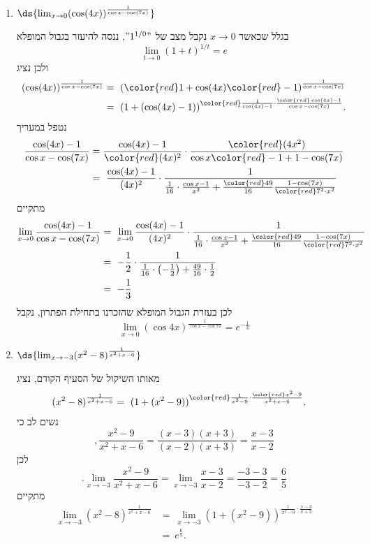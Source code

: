\begin{enumerate}
\item $\ds{ \lim_{x \to 0} (\cos(4x))^{\frac{1}{\cos x - \cos(7x)}}}$

\ifsol
{}
\begin{solbox}
בגלל שכאשר
$x\to0$
נקבל מצב של
$"1^{1/0}"$,
ננסה להיעזר בגבול המופלא
$$\lim_{t\to0}(1+t)^{1/t}=e$$
ולכן
נציג
\begin{align*}
    (\cos(4x))^{\frac{1}{\cos x - \cos(7x)}}&=\ ({\color{red}1}+\cos(4x){\color{red}-1})^{\frac{1}{\cos x - \cos(7x)}}\\
    &=\ (1+(\cos(4x)-1))^{{\color{red}\frac{1}{\cos(4x)-1}\cdot}\frac{\color{red}\cos(4x)-1}{\cos x - \cos(7x)}}.
\end{align*}
נטפל במעריך
\begin{align*}
    \frac{\cos(4x)-1}{\cos x - \cos(7x)}&=\frac{\cos(4x)-1}{\color{red}(4x)^2}\cdot\frac{\color{red}(4x^2)}{\cos x{\color{red}-1+1}-\cos(7x)}\\
    &=\ \frac{\cos(4x)-1}{(4x)^2}\cdot\frac{1}{\frac{1}{16}\cdot\frac{\cos x-1}{x^2}+\frac{\color{red}49}{16}\frac{1-\cos(7x)}{{\color{red}7^2}\cdot x^2}}
\end{align*}
מתקיים
\begin{align*}
\lim_{x\to0}\frac{\cos(4x)-1}{\cos x - \cos(7x)}&=\ \lim_{x\to0}\frac{\cos(4x)-1}{(4x)^2}\cdot\frac{1}{\frac{1}{16}\cdot\frac{\cos x-1}{x^2}+\frac{\color{red}49}{16}\frac{1-\cos(7x)}{{\color{red}7^2}\cdot x^2}}\\
&=\ -\frac{1}{2}\cdot\frac{1}{\frac{1}{16}\cdot\left(-\frac{1}{2}\right)+\frac{49}{16}\cdot\frac{1}{2}}\\
&=\ -\frac{1}{3}
\end{align*}
לכן
בעזרת הגבול המופלא שהזכרנו בתחילת הפתרון, נקבל
    $$\lim_{x \to 0} (\cos4x)^{\frac{1}{\cos x - \cos 7x}}=e^{-\frac{1}{3}}$$
\end{solbox}
\fi

\item $\ds{ \lim_{x \to -3} (x^2 - 8)^{\frac{1}{x^2 + x - 6}}}$

\ifsol
{}
\begin{solbox}
מאותו השיקול של הסעיף הקודם,
נציג
\begin{align*}
    (x^2 - 8)^{\frac{1}{x^2 + x - 6}}&=\ (1+(x^2-9))^{{\color{red}\frac{1}{x^2-9}}\cdot\frac{\color{red}x^2-9}{x^2+x-6}}.
\end{align*}
נשים לב כי
$$,\frac{x^2-9}{x^2+x-6}=\frac{(x-3)(x+3)}{(x-2)(x+3)}=\frac{x-3}{x-2}$$
לכן
$$.\lim_{x\to-3}\frac{x^2-9}{x^2+x-6}=\lim_{x\to-3}\frac{x-3}{x-2}=\frac{-3-3}{-3-2}=\frac{6}{5}$$
מתקיים
\begin{align*}
    \lim_{x \to -3} (x^2 - 8)^{\frac{1}{x^2 + x - 6}}&=\ \lim_{x \to -3}(1+(x^2-9))^{\frac{1}{x^2-9}\cdot\frac{x-3}{x+2}}\\
    &=\ e^{\frac{6}{5}}.
\end{align*}
\end{solbox}
\fi


\end{enumerate}
